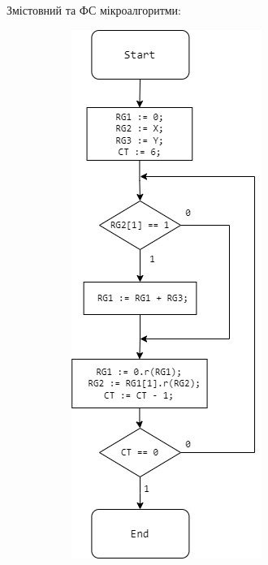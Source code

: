 \documentclass[12pt,a4paper]{article}
\begin{document}
    \newpage

    Змістовний та ФС мікроалгоритми:

    \begin{figure}[h!]
        \centering
        
        \begin{subfigure}[t]{0.45\textwidth}
            \centering
            \includegraphics[width=\linewidth]{structure_alg.png}

\end{subfigure}
\end{figure}
\end{document}
